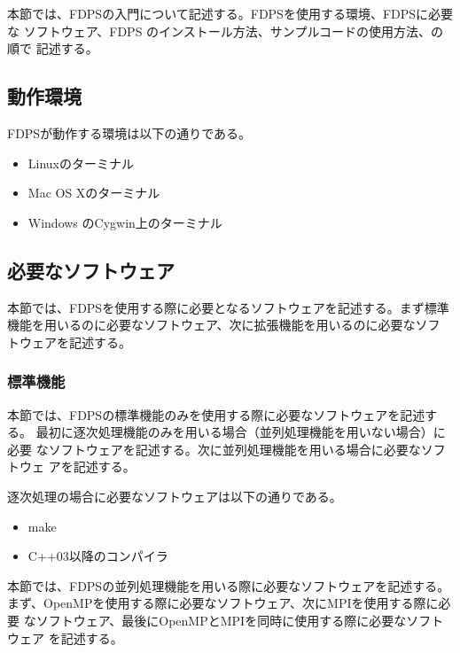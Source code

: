
本節では、FDPSの入門について記述する。FDPSを使用する環境、FDPSに必要な
ソフトウェア、FDPS のインストール方法、サンプルコードの使用方法、の順で
記述する。

\subsection{動作環境}

FDPSが動作する環境は以下の通りである。
\begin{itemize}
\item Linuxのターミナル
\item Mac OS Xのターミナル
\item Windows のCygwin上のターミナル
\end{itemize}

\subsection{必要なソフトウェア}

本節では、FDPSを使用する際に必要となるソフトウェアを記述する。まず標準
機能を用いるのに必要なソフトウェア、次に拡張機能を用いるのに必要なソフ
トウェアを記述する。

\subsubsection{標準機能}

本節では、FDPSの標準機能のみを使用する際に必要なソフトウェアを記述する。
最初に逐次処理機能のみを用いる場合（並列処理機能を用いない場合）に必要
なソフトウェアを記述する。次に並列処理機能を用いる場合に必要なソフトウェ
アを記述する。


逐次処理の場合に必要なソフトウェアは以下の通りである。
\begin{itemize}
\item make
\item C++03以降のコンパイラ
\end{itemize}


本節では、FDPSの並列処理機能を用いる際に必要なソフトウェアを記述する。
まず、OpenMPを使用する際に必要なソフトウェア、次にMPIを使用する際に必要
なソフトウェア、最後にOpenMPとMPIを同時に使用する際に必要なソフトウェア
を記述する。


